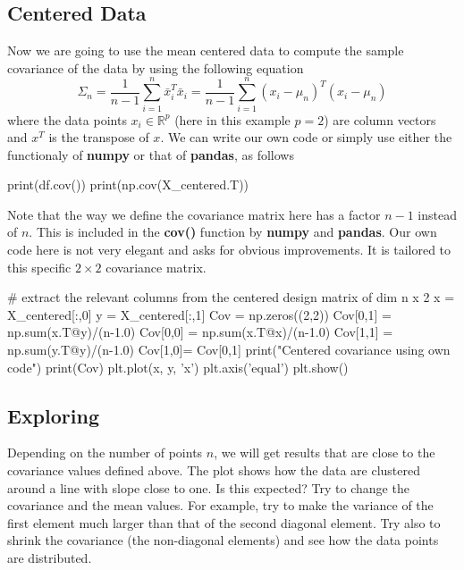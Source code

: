 \documentclass[%
oneside,                 %
final,                   %
10pt]{article}
\begin{document}
\subsection{Centered Data}

Now we are going to use the mean centered data to compute the sample covariance of the data by using the following equation
\begin{equation*}
\Sigma_n = \frac{1}{n-1} \sum_{i=1}^n \bar{x}_i^T \bar{x}_i = \frac{1}{n-1} \sum_{i=1}^n (x_i - \mu_n)^T (x_i - \mu_n)
\end{equation*}
where the data points $x_i \in \mathbb{R}^p$ (here in this example $p = 2$) are column vectors and $x^T$ is the transpose of $x$.
We can write our own code or simply use either the functionaly of \textbf{numpy} or that of \textbf{pandas}, as follows



\bpycod
print(df.cov())
print(np.cov(X_centered.T))

\epycod

Note that the way we define the covariance matrix here has a factor $n-1$ instead of $n$. This is included in the \textbf{cov()} function by \textbf{numpy} and \textbf{pandas}. 
Our own code here is not very elegant and asks for obvious improvements. It is tailored to this specific $2\times 2$ covariance matrix. 














\bpycod
# extract the relevant columns from the centered design matrix of dim n x 2
x = X_centered[:,0]
y = X_centered[:,1]
Cov = np.zeros((2,2))
Cov[0,1] = np.sum(x.T@y)/(n-1.0)
Cov[0,0] = np.sum(x.T@x)/(n-1.0)
Cov[1,1] = np.sum(y.T@y)/(n-1.0)
Cov[1,0]= Cov[0,1]
print("Centered covariance using own code")
print(Cov)
plt.plot(x, y, 'x')
plt.axis('equal')
plt.show()

\epycod


\subsection{Exploring}

Depending on the number of points $n$, we will get results that are close to the covariance values defined above.
The plot shows how the data are clustered around a line with slope close to one. Is this expected?  Try to change the covariance and the mean values. For example, try to make the variance of the first element much larger than that of the second diagonal element. Try also to shrink the covariance  (the non-diagonal elements) and see how the data points are distributed. 
\end{document}
